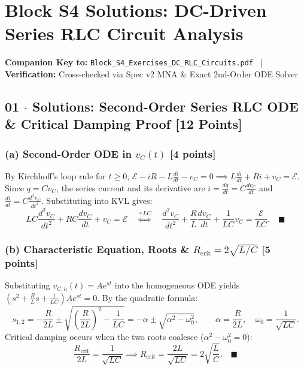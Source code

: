 \documentclass[10pt,letterpaper]{article}
\begin{document}
\section*{Block S4 Solutions: DC-Driven Series RLC Circuit Analysis}

  \textbf{Companion Key to:} \texttt{Block\_S4\_Exercises\_DC\_RLC\_Circuits.pdf} ~|~
  \textbf{Verification:} Cross-checked via Spec v2 MNA \& Exact 2nd-Order ODE Solver


\subsection*{01 $\cdot$ Solutions: Second-Order Series RLC ODE \& Critical Damping Proof \hfill [12 Points]}


  \subsubsection*{(a) Second-Order ODE in $v_C(t)$ [4 points]}
  By Kirchhoff's loop rule for $t \ge 0$, $\mathcal{E} - iR - L\frac{di}{dt} - v_C = 0 \implies L\frac{di}{dt} + Ri + v_C = \mathcal{E}$. Since $q = C v_C$, the series current and its derivative are $i = \frac{dq}{dt} = C\frac{dv_C}{dt}$ and $\frac{di}{dt} = C\frac{d^2 v_C}{dt^2}$. Substituting into KVL gives:
  $$LC\frac{d^2 v_C}{dt^2} + RC\frac{dv_C}{dt} + v_C = \mathcal{E} \quad \stackrel{\div LC}{\Longleftrightarrow} \quad \frac{d^2 v_C}{dt^2} + \frac{R}{L}\frac{dv_C}{dt} + \frac{1}{LC}v_C = \frac{\mathcal{E}}{LC}. \quad \blacksquare$$

  \subsubsection*{(b) Characteristic Equation, Roots \& $R_{\text{crit}} = 2\sqrt{L/C}$ [5 points]}
  Substituting $v_{C,h}(t) = A e^{st}$ into the homogeneous ODE yields $\left(s^2 + \frac{R}{L}s + \frac{1}{LC}\right)A e^{st} = 0$. By the quadratic formula:
  $$s_{1,2} = -\frac{R}{2L} \pm \sqrt{\left(\frac{R}{2L}\right)^2 - \frac{1}{LC}} = -\alpha \pm \sqrt{\alpha^2 - \omega_0^2}, \qquad \alpha = \frac{R}{2L}, \quad \omega_0 = \frac{1}{\sqrt{LC}}.$$
  Critical damping occurs when the two roots coalesce ($\alpha^2 - \omega_0^2 = 0$):
  $$\frac{R_{\text{crit}}}{2L} = \frac{1}{\sqrt{LC}} \implies R_{\text{crit}} = \frac{2L}{\sqrt{LC}} = 2\sqrt{\frac{L}{C}}. \quad \blacksquare$$
\end{document}

